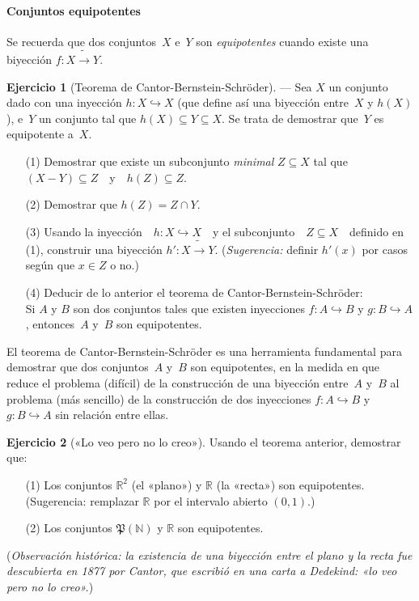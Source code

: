 \documentclass[a4paper,12pt]{book}
\newcommand{\N}{\mathbb{N}}
\newcommand{\R}{\mathbb{R}}
\def\Pow{\mathfrak{P}}
\def\into{\hookrightarrow}
\def\inonto{\mathbin{\tilde{\to}}}
\def\Pow{\mathfrak{P}}
\def\into{\hookrightarrow}
\def\inonto{\mathbin{\tilde{\to}}}
\theoremstyle{definition}
\newtheorem{ejercicio}{Ejercicio}
\begin{document}
	
	\paragraph{Conjuntos equipotentes}
	Se recuerda que dos conjuntos~$X$ e~$Y$ son \emph{equipotentes} cuando
	existe una biyección $f:X\inonto Y$.
	
	\begin{ejercicio}[Teorema de Cantor-Bernstein-Schröder]%
		\label{ejer:CantorBernstein}
		--- Sea $X$ un conjunto dado con una inyección $h:X\into X$ (que
		define así una biyección entre~$X$ y $h(X)$), e~$Y$ un conjunto tal
		que $h(X)\subseteq Y\subseteq X$.
		Se trata de demostrar que~$Y$ es equipotente a~$X$.
		\begin{enumerate}\parskip-.5ex
			\item[(1)] Demostrar que existe un subconjunto \emph{minimal}
			$Z\subseteq X$ tal que~~$(X-Y)\subseteq Z$~~y~~$h(Z)\subseteq Z$.
			\item[(2)] Demostrar que $h(Z)=Z\cap Y$.
			\item[(3)] Usando la inyección~~$h:X\into X$~~y el
			subconjunto~~$Z\subseteq X$~~definido en (1), construir una
			biyección $h':X\inonto Y$.\hfill
			(\textit{Sugerencia:} definir $h'(x)$ por casos según que
			$x\in Z$ o no.)
			\item[(4)] Deducir de lo anterior el teorema de
			Cantor-Bernstein-Schröder:\\
			Si $A$ y $B$ son dos conjuntos tales que existen inyecciones
			$f:A\into B$ y $g:B\into A$, entonces~$A$ y~$B$ son equipotentes.
		\end{enumerate}
	\end{ejercicio}
	
	El teorema de Cantor-Bernstein-Schröder es una herramienta
	fundamental para demostrar que dos conjuntos~$A$ y~$B$ son
	equipotentes, en la medida en que reduce el problema (difícil) de la
	construcción de una biyección entre~$A$ y~$B$ al problema (más
	sencillo) de la construcción de dos inyecciones $f:A\into B$ y
	$g:B\into A$ sin relación entre ellas.
	
	\begin{ejercicio}[«Lo veo pero no lo creo»]
		Usando el teorema anterior, demostrar que:
		\begin{enumerate}
			\item[(1)] Los conjuntos $\R^2$ (el «plano») y $\R$ (la «recta»)
			son equipotentes.\\
			(Sugerencia: remplazar $\R$ por el intervalo abierto $(0,1)$.)
			\item[(2)] Los conjuntos $\Pow(\N)$ y $\R$ son equipotentes.
		\end{enumerate}
		(\emph{Observación histórica: la existencia de una biyección entre
			el plano y la recta fue descubierta en 1877 por Cantor, que
			escribió en una carta a Dedekind: «lo veo pero no lo creo».})
	\end{ejercicio}
	
\end{document}
